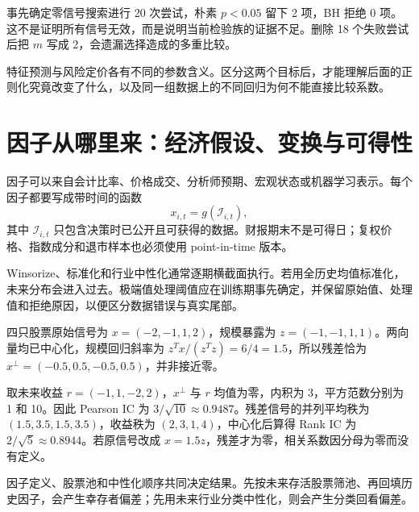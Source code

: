 事先确定零信号搜索进行 20 次尝试，朴素 $p<0.05$ 留下 2 项，BH 拒绝 0 项。这不是证明所有信号无效，而是说明当前检验族的证据不足。删除 18 个失败尝试后把 $m$ 写成 2，会遗漏选择造成的多重比较\cite{white2000reality,bailey2017backtest}。

特征预测与风险定价各有不同的参数含义。区分这两个目标后，才能理解后面的正则化究竟改变了什么，以及同一组数据上的不同回归为何不能直接比较系数。

\section{因子从哪里来：经济假设、变换与可得性}

因子可以来自会计比率、价格成交、分析师预期、宏观状态或机器学习表示。每个因子都要写成带时间的函数
\[
x_{i,t}=g(\mathcal I_{i,t}),
\]
其中 $\mathcal I_{i,t}$ 只包含决策时已公开且可获得的数据。财报期末不是可得日；复权价格、指数成分和退市样本也必须使用 point-in-time 版本。

Winsorize、标准化和行业中性化通常逐期横截面执行。若用全历史均值标准化，未来分布会进入过去。极端值处理阈值应在训练期事先确定，并保留原始值、处理值和拒绝原因，以便区分数据错误与真实尾部。


四只股票原始信号为 $x=(-2,-1,1,2)$，规模暴露为 $z=(-1,-1,1,1)$。两向量均已中心化，规模回归斜率为 $z^Tx/(z^Tz)=6/4=1.5$，所以残差恰为 $x^\perp=(-0.5,0.5,-0.5,0.5)$，并非接近零。

取未来收益 $r=(-1,1,-2,2)$，$x^\perp$ 与 $r$ 均值为零，内积为 3，平方范数分别为 1 和 10。因此 Pearson IC 为 $3/\sqrt{10}\approx0.9487$。残差信号的并列平均秩为 $(1.5,3.5,1.5,3.5)$，收益秩为 $(2,3,1,4)$，中心化后算得 Rank IC 为 $2/\sqrt5\approx0.8944$。若原信号改成 $x=1.5z$，残差才为零，相关系数因分母为零而没有定义。

\begin{diagnostic}
因子定义、股票池和中性化顺序共同决定结果。先按未来存活股票筛池、再回填历史因子，会产生幸存者偏差；先用未来行业分类中性化，则会产生分类回看偏差。
\end{diagnostic}

